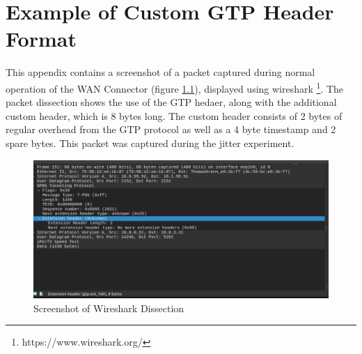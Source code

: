 
\cleardoublepage
\chapter{Example of Custom GTP Header Format}
\label{appendix:gtp}

This appendix contains a screenshot of a packet captured during normal operation of the WAN Connector (figure \ref{fig:wshark}), displayed using wireshark \footnote{https://www.wireshark.org/}. The packet dissection shows the use of the GTP hedaer, along with the additional custom header, which is 8 bytes long. The custom header consists of 2 bytes of regular overhead from the GTP protocol as well as a 4 byte timestamp and 2 spare bytes. This packet was captured during the jitter experiment.

\begin{figure}[ht]
    \centering
	\includegraphics[width=\linewidth]{fig/gtp_2.png}
	\caption{Screenshot of Wireshark Dissection}
	\label{fig:wshark}
\end{figure} 

